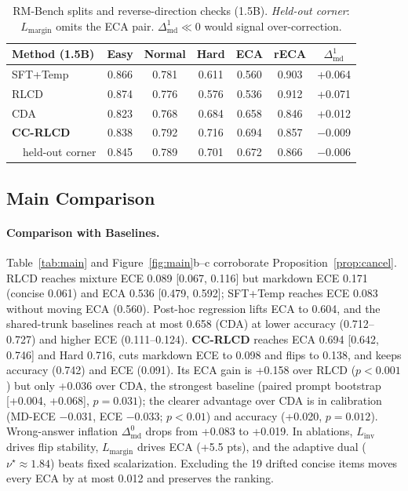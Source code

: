 \documentclass[letterpaper]{article} %
\begin{document}
\begin{table}[t]
\centering
\small
\setlength{\tabcolsep}{2.2pt}
\begin{tabular}{lcccccc}
\toprule
Method (1.5B) & Easy & Normal & Hard & ECA & rECA & $\Delta^{1}_{\mathrm{md}}$ \\
\midrule
SFT+Temp & 0.866 & 0.781 & 0.611 & 0.560 & 0.903 & +0.064 \\
RLCD & 0.874 & 0.776 & 0.576 & 0.536 & 0.912 & +0.071 \\
CDA & 0.823 & 0.768 & 0.684 & 0.658 & 0.846 & +0.012 \\
\textbf{CC-RLCD} & 0.838 & 0.792 & 0.716 & 0.694 & 0.857 & $-$0.009 \\
\ \ held-out corner & 0.845 & 0.789 & 0.701 & 0.672 & 0.866 & $-$0.006 \\
\bottomrule
\end{tabular}
\caption{RM-Bench splits and reverse-direction checks (1.5B). \emph{Held-out corner}: $L_{\mathrm{margin}}$ omits the ECA pair. $\Delta^{1}_{\mathrm{md}}\ll0$ would signal over-correction.}
\label{tab:splits}
\end{table}

\subsection{Main Comparison}
\label{sec:main}

\paragraph{Comparison with Baselines.}
Table~\ref{tab:main} and Figure~\ref{fig:main}b--c corroborate Proposition~\ref{prop:cancel}. RLCD reaches mixture ECE 0.089 [0.067, 0.116] but markdown ECE 0.171 (concise 0.061) and ECA 0.536 [0.479, 0.592]; SFT+Temp reaches ECE 0.083 without moving ECA (0.560). Post-hoc regression lifts ECA to 0.604, and the shared-trunk baselines reach at most 0.658 (CDA) at lower accuracy (0.712--0.727) and higher ECE (0.111--0.124). \textbf{CC-RLCD} reaches ECA 0.694 [0.642, 0.746] and Hard 0.716, cuts markdown ECE to 0.098 and flips to 0.138, and keeps accuracy (0.742) and ECE (0.091). Its ECA gain is +0.158 over RLCD ($p{<}0.001$) but only +0.036 over CDA, the strongest baseline (paired prompt bootstrap [+0.004, +0.068], $p{=}0.031$); the clearer advantage over CDA is in calibration (MD-ECE $-$0.031, ECE $-$0.033; $p{<}0.01$) and accuracy (+0.020, $p{=}0.012$). Wrong-answer inflation $\Delta^0_{\mathrm{md}}$ drops from +0.083 to +0.019. In ablations, $L_{\mathrm{inv}}$ drives flip stability, $L_{\mathrm{margin}}$ drives ECA (+5.5 pts), and the adaptive dual ($\nu^\star{\approx}1.84$) beats fixed scalarization. Excluding the 19 drifted concise items moves every ECA by at most 0.012 and preserves the ranking.
\end{document}
